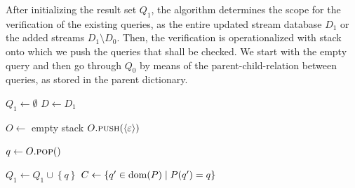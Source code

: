 After initializing the result set $Q_1$, the
algorithm determines the scope for the verification
of the existing queries, as the entire updated
stream database $D_1$ or the added streams
$D_1\setminus D_0$. Then, the verification is
operationalized with stack onto
which we push the queries that shall be checked. We start
with the empty query and then go through $Q_0$ by means of
the parent-child-relation between queries, as stored in
the parent dictionary.





\begin{algorithm}[t]
    \small
    \caption{\textsc{UpdatePlus}}
    \label{alg_gen}
    \BlankLine
    $\mathit{Q_1 \leftarrow \emptyset}$\;
    {
        $D \leftarrow D_1$}

    ${O \leftarrow}$ empty stack\;
    $O.\textsc{push}(\langle\varepsilon\rangle)$\;
    {
            ${q \leftarrow O}.\textsc{pop}()$\;

             {

            ${Q_1 \leftarrow Q_1 \cup \left\{q\right\}
            }$\;
            ${C} \leftarrow  \{q'\in \operatorname{dom}(P) \mid P(q')=q\}$\;
            }

    }
    {}
    \end{algorithm}

